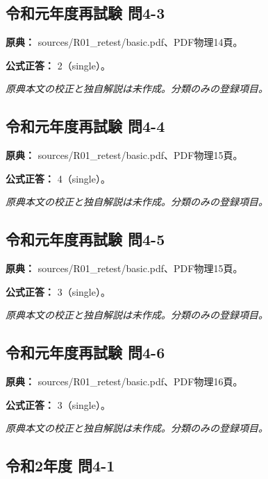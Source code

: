 \subsection{令和元年度再試験 問4-3}
\label{q:r01-ret-basic-4-3}

\noindent\textbf{原典：} sources/R01\_retest/basic.pdf、PDF物理14頁。

\textbf{公式正答：} 2（single）。

\par\textit{原典本文の校正と独自解説は未作成。分類のみの登録項目。}

\subsection{令和元年度再試験 問4-4}
\label{q:r01-ret-basic-4-4}

\noindent\textbf{原典：} sources/R01\_retest/basic.pdf、PDF物理15頁。

\textbf{公式正答：} 4（single）。

\par\textit{原典本文の校正と独自解説は未作成。分類のみの登録項目。}

\subsection{令和元年度再試験 問4-5}
\label{q:r01-ret-basic-4-5}

\noindent\textbf{原典：} sources/R01\_retest/basic.pdf、PDF物理15頁。

\textbf{公式正答：} 3（single）。

\par\textit{原典本文の校正と独自解説は未作成。分類のみの登録項目。}

\subsection{令和元年度再試験 問4-6}
\label{q:r01-ret-basic-4-6}

\noindent\textbf{原典：} sources/R01\_retest/basic.pdf、PDF物理16頁。

\textbf{公式正答：} 3（single）。

\par\textit{原典本文の校正と独自解説は未作成。分類のみの登録項目。}

\subsection{令和2年度 問4-1}
\label{q:r02-reg-basic-4-1}

